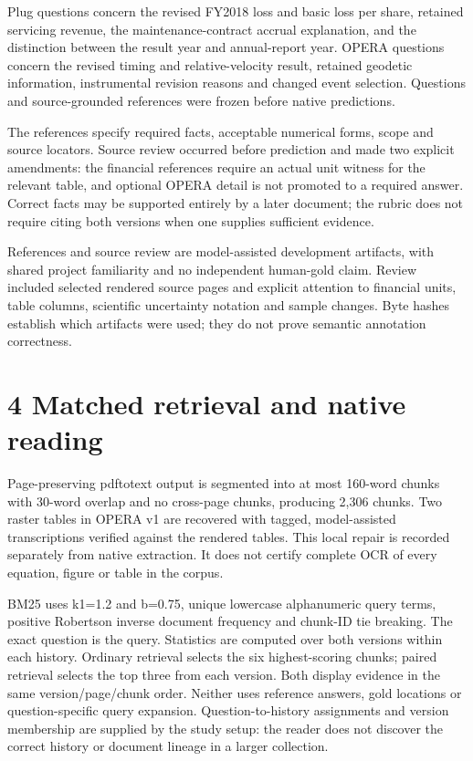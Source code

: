 \documentclass[11pt]{article}
\begin{document}
Plug questions concern the revised FY2018 loss and basic loss per share, retained servicing revenue, the maintenance-contract accrual explanation, and the distinction between the result year and annual-report year. OPERA questions concern the revised timing and relative-velocity result, retained geodetic information, instrumental revision reasons and changed event selection. Questions and source-grounded references were frozen before native predictions.

The references specify required facts, acceptable numerical forms, scope and source locators. Source review occurred before prediction and made two explicit amendments: the financial references require an actual unit witness for the relevant table, and optional OPERA detail is not promoted to a required answer. Correct facts may be supported entirely by a later document; the rubric does not require citing both versions when one supplies sufficient evidence.

References and source review are model-assisted development artifacts, with shared project familiarity and no independent human-gold claim. Review included selected rendered source pages and explicit attention to financial units, table columns, scientific uncertainty notation and sample changes. Byte hashes establish which artifacts were used; they do not prove semantic annotation correctness.

\section*{4  Matched retrieval and native reading}
Page-preserving pdftotext output is segmented into at most 160-word chunks with 30-word overlap and no cross-page chunks, producing 2,306 chunks. Two raster tables in OPERA v1 are recovered with tagged, model-assisted transcriptions verified against the rendered tables. This local repair is recorded separately from native extraction. It does not certify complete OCR of every equation, figure or table in the corpus.

BM25 uses k1=1.2 and b=0.75, unique lowercase alphanumeric query terms, positive Robertson inverse document frequency and chunk-ID tie breaking. The exact question is the query. Statistics are computed over both versions within each history. Ordinary retrieval selects the six highest-scoring chunks; paired retrieval selects the top three from each version. Both display evidence in the same version/page/chunk order. Neither uses reference answers, gold locations or question-specific query expansion. Question-to-history assignments and version membership are supplied by the study setup: the reader does not discover the correct history or document lineage in a larger collection.
\end{document}
